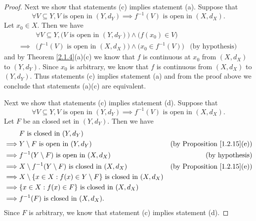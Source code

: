 \begin{proof}
    Next we show that statements (c) implies statement (a).
    Suppose that
    \[
        \forall V \subseteq Y, V \text{ is open in } (Y, d_Y) \implies f^{-1}(V) \text{ is open in } (X, d_X).
    \]
    Let \(x_0 \in X\).
    Then we have
    \begin{align*}
                 & \forall V \subseteq Y, \big(V \text{ is open in } (Y, d_Y)\big) \land \big(f(x_0) \in V\big)                          \\
        \implies & \big(f^{-1}(V) \text{ is open in } (X, d_X)\big) \land \big(x_0 \in f^{-1}(V)\big)           & \text{(by hypothesis)}
    \end{align*}
    and by Theorem \ref{2.1.4}(a)(c) we know that \(f\) is continuous at \(x_0\) from \((X, d_X)\) to \((Y, d_Y)\).
    Since \(x_0\) is arbitrary, we know that \(f\) is continuous from \((X, d_X)\) to \((Y, d_Y)\).
    Thus statements (c) implies statement (a) and from the proof above we conclude that statements (a)(c) are equivalent.

    Next we show that statements (c) implies statement (d).
    Suppose that
    \[
        \forall V \subseteq Y, V \text{ is open in } (Y, d_Y) \implies f^{-1}(V) \text{ is open in } (X, d_X).
    \]
    Let \(F\) be an closed set in \((Y, d_Y)\).
    Then we have
    \begin{align*}
                 & F \text{ is closed in } (Y, d_Y)                                                                                          \\
        \implies & Y \setminus F \text{ is open in } (Y, d_Y)                                      & \text{(by Proposition \ref{1.2.15}(e))} \\
        \implies & f^{-1}(Y \setminus F) \text{ is open in } (X, d_X)                              & \text{(by hypothesis)}                  \\
        \implies & X \setminus f^{-1}(Y \setminus F) \text{ is closed in } (X, d_X)                & \text{(by Proposition \ref{1.2.15}(e))} \\
        \implies & X \setminus \{x \in X : f(x) \in Y \setminus F\} \text{ is closed in } (X, d_X)                                           \\
        \implies & \{x \in X : f(x) \in F\} \text{ is closed in } (X, d_X)                                                                   \\
        \implies & f^{-1}(F) \text{ is closed in } (X, d_X).
    \end{align*}
    Since \(F\) is arbitrary, we know that statement (c) implies statement (d).


\end{proof}
